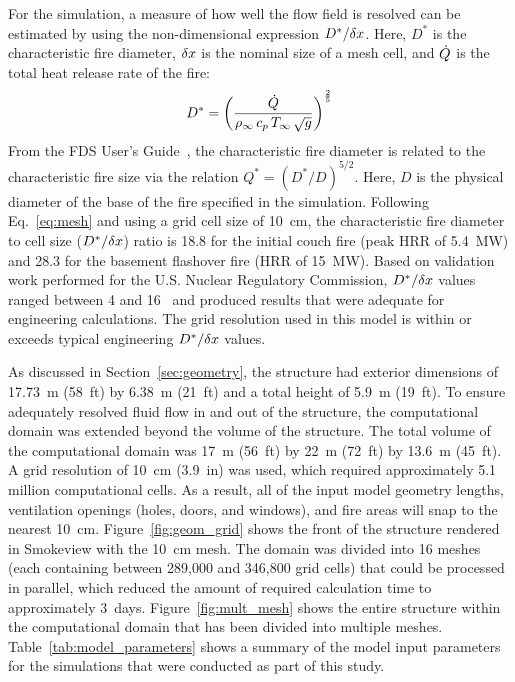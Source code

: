 \documentclass[12pt,oneside]{book}
\begin{document}
For the simulation, a measure of how well the flow field is resolved can be estimated by using the non-dimensional expression $D^*/\delta x$. Here, $D^*$ is the characteristic fire diameter, $\delta x$ is the nominal size of a mesh cell, and $\dot{Q}$ is the total heat release rate of the fire:
\begin{equation}
D^* = \left(
     \frac{\dot{Q}}{\rho_\infty \, c_p \, T_\infty \, \sqrt{g}}
     \right)^\frac{2}{5} 
\label{eq:mesh}
\end{equation}
From the FDS User's Guide~\cite{FDS_Users_Guide}, the characteristic fire diameter is related to the characteristic fire size via the relation $Q^* = (D^*/D)^{5/2}$. Here, $D$ is the physical diameter of the base of the fire specified in the simulation. Following Eq.~\ref{eq:mesh} and using a grid cell size of 10~cm, the characteristic fire diameter to cell size ($D^*/\delta x$) ratio is 18.8 for the initial couch fire (peak HRR of 5.4~MW) and 28.3 for the basement flashover fire (HRR of 15~MW). Based on validation work performed for the U.S. Nuclear Regulatory Commission, $D^*/\delta x$ values ranged between 4 and 16~\cite{NUREG_1824} and produced results that were adequate for engineering calculations. The grid resolution used in this model is within or exceeds typical engineering $D^*/\delta x$ values.

As discussed in Section~\ref{sec:geometry}, the structure had exterior dimensions of 17.73~m (58~ft) by 6.38~m (21~ft) and a total height of 5.9~m (19~ft). To ensure adequately resolved fluid flow in and out of the structure, the computational domain was extended beyond the volume of the structure. The total volume of the computational domain was 17~m (56~ft) by 22~m (72~ft) by 13.6~m (45~ft). A grid resolution of 10~cm (3.9~in) was used, which required approximately 5.1 million computational cells. As a result, all of the input model geometry lengths, ventilation openings (holes, doors, and windows), and fire areas will snap to the nearest 10~cm. Figure~\ref{fig:geom_grid} shows the front of the structure rendered in Smokeview with the 10~cm mesh. The domain was divided into 16 meshes (each containing between 289,000 and 346,800 grid cells) that could be processed in parallel, which reduced the amount of required calculation time to approximately 3~days. Figure~\ref{fig:mult_mesh} shows the entire structure within the computational domain that has been divided into multiple meshes. Table~\ref{tab:model_parameters} shows a summary of the model input parameters for the simulations that were conducted as part of this study.
\end{document}
